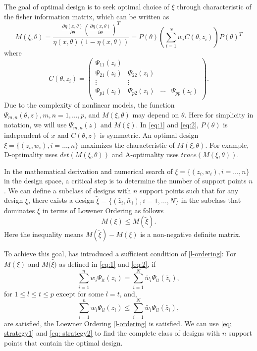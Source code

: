 \documentclass[11pt]{amsart}
\theoremstyle{definition}
\theoremstyle{remark}
\numberwithin{equation}{section}
\begin{document}
The goal of optimal design is to seek optimal choice of $\xi$ through characteristic of the fisher information matrix, which can be written as \begin{equation}\label{eq:1}
M(\xi,\theta) = \frac{\frac{\partial\eta(x,\theta)}{\partial\theta}(\frac{\partial\eta(x,\theta)}{\partial\theta})^T}{\eta(x,\theta)(1-\eta(x,\theta))} = P(\theta)(\sum_{i=1}^Nw_iC(\theta,z_i))P(\theta)^T
\end{equation}where \begin{equation}\label{eq:2}
C(\theta,z_i) = \left ( \begin{array}{cccc}
\Psi_{11}(z_i) &&&\\
\Psi_{21}(z_i) &\Psi_{22}(z_i)&&\\
\vdots & \vdots &&\\
\Psi_{p1}(z_i) &\Psi_{p2}(z_i)&\cdots&\Psi_{pp}(z_i)\\
\end{array} \right).\end{equation}
Due to the complexity of nonlinear models, the function $\Psi_{m,n}(\theta,z), m,n=1,\ldots,p$, and $M(\xi,\theta)$ may depend on $\theta$. Here for simplicity in notation, we will use $  \Psi_{m,n}(z)$ and $M(\xi)$. In \eqref{eq:1} and \eqref{eq:2}, $P(\theta)$ is independent of $x$ and $C(\theta,z)$ is symmetric. An optimal design $\xi = \{(z_i,w_i), i=\ldots,n\}$ maximizes the characteristic of  $M(\xi,\theta)$. For example, D-optimality uses $det(M(\xi,\theta))$ and A-optimality uses  $trace(M(\xi,\theta))$. 

In the mathematical derivation and numerical search of $\xi = \{(z_i,w_i), i=\ldots,n\}$ in the design space, a critical step is to determine the number of support points $n$. We can define a subclass of designs with $n$ support points such that for any design $\xi$, there exists a design $\tilde{\xi} = \{(\tilde{z_i},\tilde{w_i}), i=1,\ldots,N\}$ in the subclass that dominates $\xi$ in terms of Lowener Ordering as follows
\begin{equation}\label{l-ordering}
    M(\xi)\le M(\tilde{\xi}).
\end{equation} Here the inequality means $M(\tilde{\xi})-M(\xi)$ is a non-negative definite matrix.

To achieve this goal, \cite{yang2010} has introduced a sufficient condition of \eqref{l-ordering}: For $M(\xi)$ and $M(\tilde{\xi)}$ as defined in \eqref{eq:1} and \eqref{eq:2}, if 
\begin{equation}\label{eq: strategy1}
\sum_{i=1}^{n} w_i \Psi_{lt}(z_i) =\sum_{i=1}^{N} \tilde{w_i} \Psi_{lt}(\tilde{z_i}),\end{equation} for $1\le l\le t \le p$ except for some $l=t $, and, \begin{equation}\label{eq: strategy2}
\sum_{i=1}^{n} w_i \Psi_{ll}(z_i) \le \sum_{i=1}^{N} \tilde{w_i} \Psi_{ll}(\tilde{z_i}), \end{equation} are satisfied, the Loewner Ordering \eqref{l-ordering} is satisfied.
We can use \eqref{eq: strategy1} and \eqref{eq: strategy2} to find the complete class of designs with $n$ support points that contain the optimal design.
\end{document}
